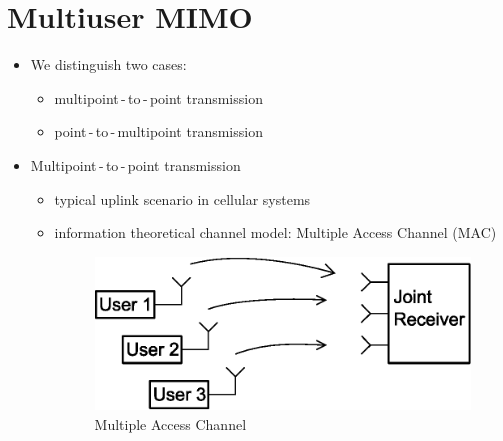 \documentclass[a4paper, 10pt]{article}
\begin{document}
\section{Multiuser MIMO}
\begin{itemize}
	\item We distinguish two cases:
	\begin{itemize}
		\item multipoint\,-\,to\,-\,point transmission
		\item point\,-\,to\,-\,multipoint transmission
	\end{itemize}
	\item Multipoint\,-\,to\,-\,point transmission
	\begin{itemize}
		\item typical uplink scenario in cellular systems
		\item information theoretical channel model: Multiple Access Channel (MAC)
		\begin{figure}[h]
			\centering
			\includegraphics[scale=0.8]{MAC}
			\caption{Multiple Access Channel}
			\label{fig:MAC}		
		\end{figure}

\end{itemize}
\end{itemize}
\end{document}
